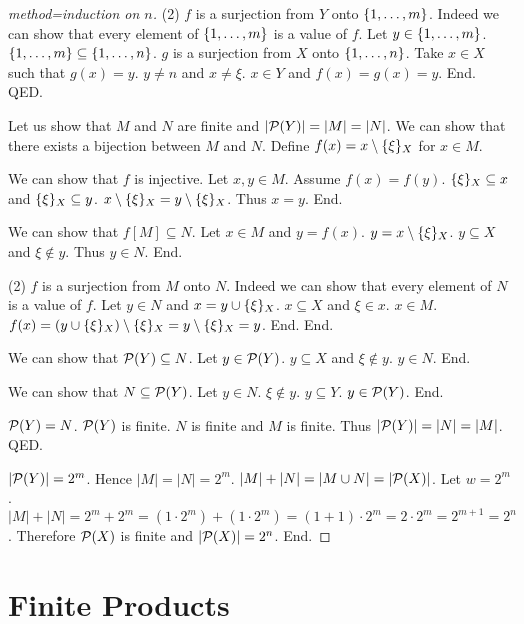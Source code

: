 \documentclass{article}
\begin{document}
\begin{forthel}
\begin{proof}[method=induction on $n$]
      (2) $f$ is a surjection from $Y$ onto $\{1,\dots,m\}$.
      Indeed we can show that every element of $\{1,\dots,m\}$ is a value of $f$.
        Let $y \in \{1,\dots,m\}$. $\{1,\dots,m\} \subseteq \{1,\dots,n\}$. $g$ is a surjection from $X$ onto $\{1,\dots,n\}$.
        Take $x \in X$ such that $g(x) = y$. $y \neq n$ and $x \neq \xi$. $x \in Y$ and $f(x) = g(x) = y$. End.
    QED.


    Let us show that $M$ and $N$ are finite and $|{\cal P}(Y)| = |M| = |N|$.
      We can show that there exists a bijection between $M$ and $N$.
        Define $f(x) = x \setminus \{\xi\}_{X}$ for $x \in M$.

        We can show that $f$ is injective.
          Let $x,y \in M$. Assume $f(x) = f(y)$. $\{\xi\}_{X} \subseteq x$ and $\{\xi\}_{X} \subseteq y$.
          $x \setminus \{\xi\}_{X} = y \setminus \{\xi\}_{X}$. Thus $x = y$. End.

        We can show that $f[M] \subseteq N$.
          Let $x \in M$ and $y = f(x)$. $y = x \setminus \{\xi\}_{X}$. $y \subseteq X$ and $\xi \notin y$. Thus $y \in N$. End.

        (2) $f$ is a surjection from $M$ onto $N$.
        Indeed we can show that every element of $N$ is a value of $f$.
          Let $y \in N$ and $x = y \cup \{\xi\}_{X}$. $x \subseteq X$ and $\xi \in x$. $x \in M$.
          $f(x) = (y \cup \{\xi\}_{X}) \setminus \{\xi\}_{X} = y \setminus \{\xi\}_{X} = y$. End.
      End.

      We can show that ${\cal P}(Y) \subseteq N$.
        Let $y \in {\cal P}(Y)$. $y \subseteq X$ and $\xi \notin y$. $y \in N$. End.

      We can show that $N \subseteq {\cal P}(Y)$.
        Let $y \in N$. $\xi \notin y$. $y \subseteq Y$. $y \in {\cal P}(Y)$. End.


      ${\cal P}(Y) = N$. ${\cal P}(Y)$ is finite. $N$ is finite and $M$ is finite.
      Thus $|{\cal P}(Y)| = |N| = |M|$.
    QED.

    $|{\cal P}(Y)| = 2^{m}$. Hence $|M| = |N| = 2^{m}$. $|M| + |N| = |M \cup N| = |{\cal P}(X)|$. Let $w = 2^{m}$.
    $|M| + |N| = 2^{m} + 2^{m} = (1 \cdot 2^{m}) + (1 \cdot 2^{m}) = (1 + 1) \cdot 2^{m} =  2 \cdot 2^{m} = 2^{m+1} = 2^{n}$.
    Therefore ${\cal P}(X)$ is finite and $|{\cal P}(X)| = 2^{n}$.
  End.
  \end{proof}

  \end{forthel}



\section{Finite Products}
\end{document}

